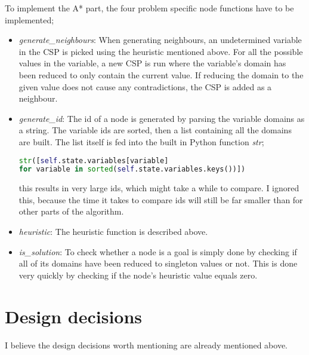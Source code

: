 \documentclass{article}
\begin{document}
To implement the A* part, the four problem specific node functions have to be implemented;
\begin{itemize}
	\item \textit{generate\_neighbours}: When generating neighbours, an undetermined variable in the CSP is picked using the heuristic mentioned above. For all the possible values in the variable, a new CSP is run where the variable's domain has been reduced to only contain the current value. If reducing the domain to the given value does not cause any contradictions, the CSP is added as a neighbour.
	\item \textit{generate\_id}: The id of a node is generated by parsing the variable domains as a string. The variable ids are sorted, then a list containing all the domains are built. The list itself is fed into the built in Python function \textit{str};
\begin{lstlisting}[language=Python]
str([self.state.variables[variable]
for variable in sorted(self.state.variables.keys())])		
\end{lstlisting}	
    this results in very large ids, which might take a while to compare. I ignored this, because the time it takes to compare ids will still be far smaller than for other parts of the algorithm.
	\item \textit{heuristic}: The heuristic function is described above.
	\item \textit{is\_solution}: To check whether a node is a goal is simply done by checking if all of its domains have been reduced to singleton values or not. This is done very quickly by checking if the node's heuristic value equals zero.
\end{itemize}

\section*{Design decisions}
I believe the design decisions worth mentioning are already mentioned above.

\end{document}
